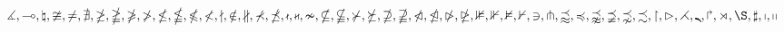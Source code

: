 $
      \measuredangle,
      \multimap,
      \natural,
      \ncong,
      \ne,
      \nexists,
      \ngeq,
      \ngeqq,
      \ngeqslant,
      \ngtr,
      \nleq,
      \nleqq,
      \nleqslant,
      \nless,
      \nmid,
      \notin,
      \nparallel,
      \nprec,
      \npreceq,
      \nshortmid,
      \nshortparallel,
      \nsim,
      \nsubseteq,
      \nsubseteqq,
      \nsucc,
      \nsucceq,
      \nsupseteq,
      \nsupseteqq,
      \ntriangleleft,
      \ntrianglelefteq,
      \ntriangleright,
      \ntrianglerighteq,
      \nVDash,
      \nVdash,
      \nvDash,
      \nvdash,
      \owns,
      \pitchfork,
      \precapprox,
      \preccurlyeq,
      \precnapprox,
      \precneqq,
      \precnsim,
      \precsim,
      \restriction,
      \rhd,
      \rightthreetimes,
      \rmoustache,
      \Rsh,
      \rtimes,
      \S,
      \sharp,
      \shortmid,
      \shortparallel
$